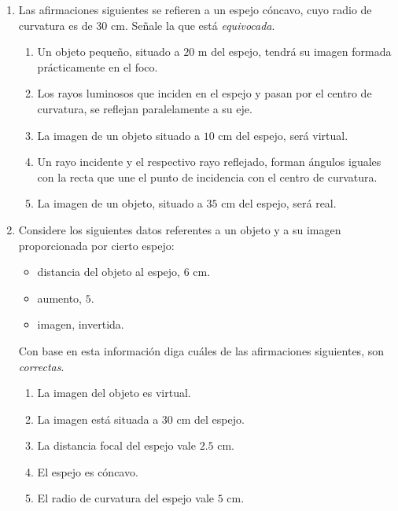 \documentclass[a4paper, amsfonts, amssymb, amsmath, reprint, showkeys, nofootinbib, twoside]{revtex4-1}
\begin{document}
\begin{enumerate}[start=1, label=\textbf{\arabic*.}]
    \item Las afirmaciones siguientes se refieren a un espejo cóncavo, cuyo radio de curvatura es de $30 \text{ cm}$. Señale la que está \emph{equivocada}.
          \begin{enumerate}[label=\emph{\alph*})]
              \item Un objeto pequeño, situado a $20 \text{ m}$ del espejo, tendrá su imagen formada prácticamente en el foco.
              \item Los rayos luminosos que inciden en el espejo y pasan por el centro de curvatura, se reflejan paralelamente a su eje.
              \item La imagen de un objeto situado a $10 \text{ cm}$ del espejo, será virtual.
              \item Un rayo incidente y el respectivo rayo reflejado, forman ángulos iguales con la recta que une el punto de incidencia con el centro de curvatura.
              \item La imagen de un objeto, situado a $35 \text{ cm}$ del espejo, será real.
          \end{enumerate}

    \item Considere los siguientes datos referentes a un objeto y a su imagen proporcionada por cierto espejo:
          \begin{itemize}
              \item distancia del objeto al espejo, $6 \text{ cm}$.
              \item aumento, $5$.
              \item imagen, invertida.
          \end{itemize}
          Con base en esta información diga cuáles de las afirmaciones siguientes, son \emph{correctas}.
          \begin{enumerate}[label=\emph{\alph*})]
              \item La imagen del objeto es virtual.
              \item La imagen está situada a $30 \text{ cm}$ del espejo.
              \item La distancia focal del espejo vale $2.5 \text{ cm}$.
              \item El espejo es cóncavo.
              \item El radio de curvatura del espejo vale $5 \text{ cm}$.
          \end{enumerate}


\end{enumerate}
\end{document}
